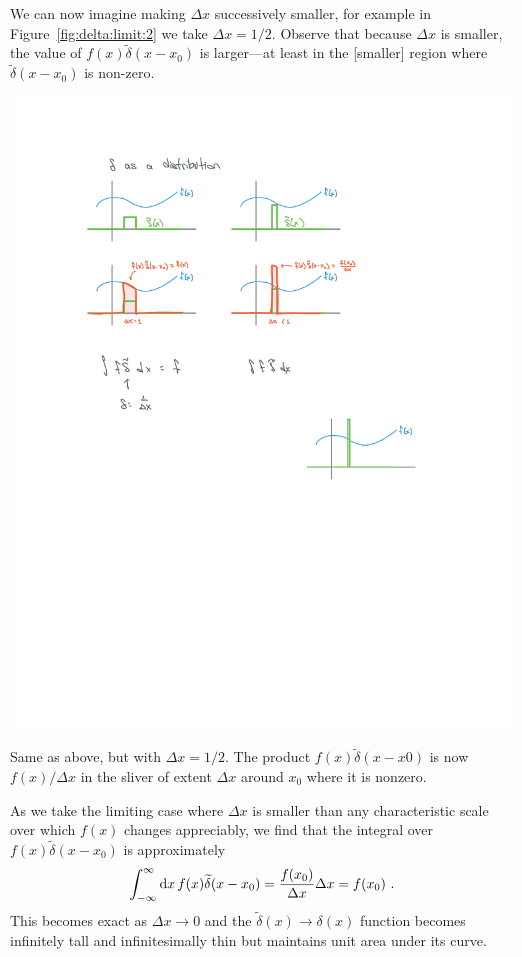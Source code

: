 \documentclass[12pt, oneside]{report}    %
\begin{document}
\begin{subappendices}
We can now imagine making $\Delta x$ successively smaller, for example in Figure~\ref{fig:delta:limit:2} we take $\Delta x = 1/2$. Observe that because $\Delta x$ is smaller, the value of $f(x)\tilde\delta(x-x_0)$ is larger---at least in the [smaller] region where $\tilde\delta(x-x_0)$ is non-zero. 
\begin{marginfigure}%
    \includegraphics[width=\textwidth]{figures/Delta_limit_02.pdf}
    \caption{Same as above, but with $\Delta x = 1/2$. The product $f(x)\tilde \delta(x-x0)$ is now $f(x)/\Delta x$ in the sliver of extent $\Delta x$ around $x_0$ where it is nonzero.}
    \label{fig:delta:limit:2}
\end{marginfigure}
As we take the limiting case where $\Delta x$ is smaller than any characteristic scale over which $f(x)$ changes appreciably, we find that the integral over $f(x)\tilde\delta(x-x_0)$ is approximately
\begin{align}
    \int_{-\infty}^\infty \operatorname{d}\!{x}\, f(x)\widetilde\delta(x-x_0) = \frac{f(x_0)}{\Delta x} \Delta x = f(x_0) \ .
\end{align}
This becomes exact as $\Delta x \to 0$ and the $\tilde\delta(x)\to \delta(x)$ function becomes infinitely tall and infinitesimally thin but maintains unit area under its curve.


\end{subappendices}
\end{document}
